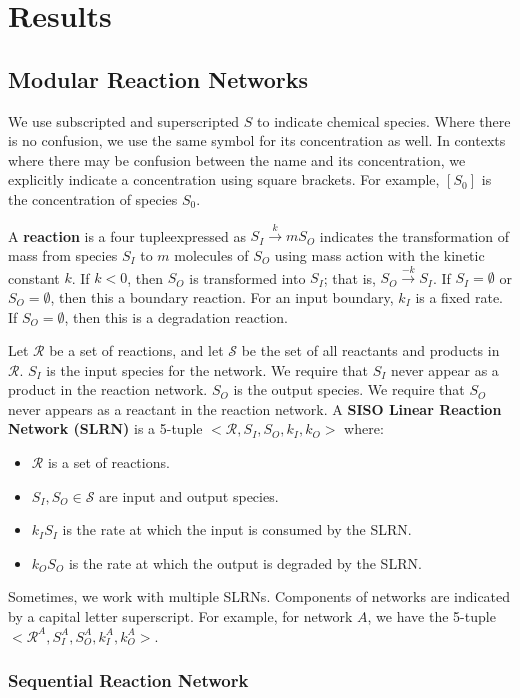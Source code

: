 \documentclass[unnumsec,webpdf,contemporary,large]{oup-authoring-template}%
\theoremstyle{thmstyleone}%
\theoremstyle{thmstyletwo}%
\theoremstyle{thmstylethree}%
\begin{document}
\section{Results}\label{results}
\subsection{Modular Reaction Networks}

We use subscripted and superscripted $S$ to indicate chemical species. Where there is no confusion, we use the same symbol for its concentration as well. In contexts where there may be confusion between the name and its concentration, we explicitly indicate a concentration using square brackets. For example, $[S_0]$ is the concentration of species $S_0$.

A {\bf reaction} is a four tupleexpressed as $S_I \xrightarrow{k} m S_O$
indicates the transformation of mass from species $S_I$ to $m$ molecules of $S_O$
using mass action with the kinetic constant $k$. If $k < 0$,
then $S_O$ is transformed into $S_I$; that is, $S_O \xrightarrow{-k} S_I$.
If $S_I = \emptyset$ or $S_O = \emptyset$, then this a boundary reaction.
For an input boundary, $k_I$ is a fixed rate.
If $S_O = \emptyset$, then this is a degradation reaction.

Let $\mathcal{R}$ be a set of reactions, and let
$\mathcal{S}$ be the set of all reactants and products in $\mathcal{R}$.
$S_I$ is the input species for the network.
We require that $S_I$ never appear as a product in the reaction network.
$S_O$ is the output species.
We require that $S_O$ never appears as a reactant in the reaction network.
A {\bf SISO Linear Reaction Network (SLRN)} is
a 5-tuple
$<\mathcal{R}, S_I, S_O, k_I, k_O>$ where:
\begin{itemize}
    \item $\mathcal{R}$ is a set of reactions.
    \item 
    $S_I, S_O \in \mathcal{S}$ are input and output species.
    \item $k_I S_I$ is the rate at which the input is consumed
    by the SLRN.
    \item $k_O S_O$ is the rate at which the output is degraded by the SLRN.
\end{itemize}
Sometimes, we work with multiple SLRNs. Components of networks are indicated by a
capital letter superscript.
For example, for network $A$, we have the 5-tuple
$<\mathcal{R}^A, S^A_I, S^A_O, k^A_I, k^A_O>$.

\subsubsection{Sequential Reaction Network}
\end{document}
